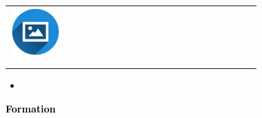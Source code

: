 \documentclass{article}
\begin{document}
\begin{paracol}{2}
\colorbox{maincolor}{%
  \begin{minipage}{\linewidth}
    \begin{tabular}{@{}lp{0.72\linewidth}r}
      \begin{minipage}{0.05\linewidth}
        \includegraphics[width=\linewidth]{picon.png}
      \end{minipage} & 
       &  
       \\[-10pt]
      & {\color{sidetext}} & \\
      & {\small  } & \\
    \end{tabular}
\begin{itemize}
    \item 
\end{itemize}
  \end{minipage}%
}


\vspace{1cm}

\textcolor{black}{\Large \textbf{Formation}} \\



\end{paracol}
\end{document}
